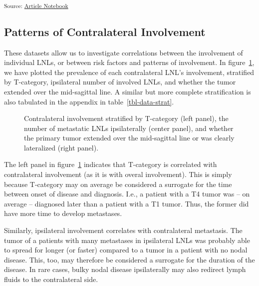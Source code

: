 \documentclass[
  sn-mathphys-num,
]{sn-jnl}
\begin{document}
\textsubscript{Source:
\href{https://rmnldwg.github.io/bilateral-paper/manuscript-preview.html}{Article
Notebook}}

\subsection{Patterns of Contralateral Involvement}\label{sec-data-strat}

These datasets allow us to investigate correlations between the
involvement of individual LNLs, or between risk factors and patterns of
involvement. In figure~\ref{fig-data-strat}, we have plotted the
prevalence of each contralateral LNL's involvement, stratified by
T-category, ipsilateral number of involved LNLs, and whether the tumor
extended over the mid-sagittal line. A similar but more complete
stratification is also tabulated in the appendix in
table~\ref{tbl-data-strat}.

\begin{figure}


\caption{\label{fig-data-strat}Contralateral involvement stratified by
T-category (left panel), the number of metastatic LNLs ipsilaterally
(center panel), and whether the primary tumor extended over the
mid-sagittal line or was clearly lateralized (right panel).}

\end{figure}%

The left panel in figure~\ref{fig-data-strat} indicates that T-category
is correlated with contralateral involvement (as it is with overal
involvement). This is simply because T-category may on average be
considered a surrogate for the time between onset of disease and
diagnosis. I.e., a patient with a T4 tumor was -- on average --
diagnosed later than a patient with a T1 tumor. Thus, the former did
have more time to develop metastases.

Similarly, ipsilateral involvement correlates with contralateral
metastasis. The tumor of a patients with many metastases in ipsilateral
LNLs was probably able to spread for longer (or faster) compared to a
tumor in a patient with no nodal disease. This, too, may therefore be
considered a surrogate for the duration of the disease. In rare cases,
bulky nodal disease ipsilaterally may also redirect lymph fluids to the
contralateral side.
\end{document}
